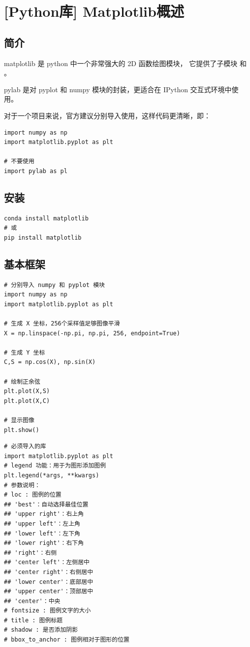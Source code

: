 \chapter{[Python库] Matplotlib概述}

\section{简介}
matplotlib 是 python 中一个非常强大的 2D 函数绘图模块，
它提供了子模块  和 。

pylab 是对 pyplot 和 numpy 模块的封装，更适合在 IPython 交互式环境中使用。

对于一个项目来说，官方建议分别导入使用，这样代码更清晰，即：
\begin{lstlisting}[style=pythonstyle]
import numpy as np
import matplotlib.pyplot as plt

# 不要使用
import pylab as pl
\end{lstlisting}

\section{安装}
\begin{lstlisting}[style=demostyle,numbers=none]
conda install matplotlib
# 或
pip install matplotlib
\end{lstlisting}



\section{基本框架}
\begin{lstlisting}[style=pythonstyle]
# 分别导入 numpy 和 pyplot 模块
import numpy as np
import matplotlib.pyplot as plt

# 生成 X 坐标，256个采样值足够图像平滑
X = np.linspace(-np.pi, np.pi, 256, endpoint=True)

# 生成 Y 坐标
C,S = np.cos(X), np.sin(X)

# 绘制正余弦
plt.plot(X,S)
plt.plot(X,C)

# 显示图像
plt.show()
\end{lstlisting}

\begin{lstlisting}[style=demostyle,numbers=none]
# 必须导入的库
import matplotlib.pyplot as plt
# legend 功能：用于为图形添加图例
plt.legend(*args, **kwargs)
# 参数说明：
# loc : 图例的位置
## 'best'：自动选择最佳位置
## 'upper right'：右上角
## 'upper left'：左上角
## 'lower left'：左下角
## 'lower right'：右下角
## 'right'：右侧
## 'center left'：左侧居中
## 'center right'：右侧居中
## 'lower center'：底部居中
## 'upper center'：顶部居中
## 'center'：中央
# fontsize : 图例文字的大小
# title : 图例标题
# shadow : 是否添加阴影
# bbox_to_anchor : 图例相对于图形的位置
\end{lstlisting}

